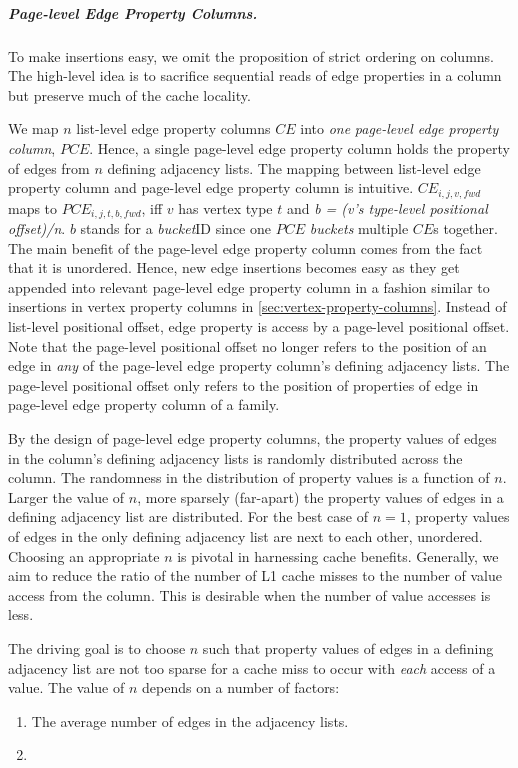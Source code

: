 \vspace{-16pt}
\subparagraph{Page-level Edge Property Columns.}
To make insertions easy, we omit the proposition of strict ordering on columns. The high-level idea is to sacrifice sequential reads of edge properties in a column but preserve much of the cache locality.

We map $n$ list-level edge property columns $CE$ into \emph{one} \emph{page-level edge property column}, $PCE$. Hence, a single page-level edge property column holds the property of edges from $n$ defining adjacency lists. The mapping between list-level edge property column and page-level edge property column is intuitive. $CE_{i,j,v,fwd}$ maps to $PCE_{i,j,t,b,fwd}$, iff $v$ has vertex type $t$ and \emph{b = (v's type-level positional offset)/n}. $b$ stands for a \emph{bucket}ID since  one $PCE$ \emph{buckets} multiple $CE$s together. The main benefit of the page-level edge property column comes from the fact that it is unordered. Hence, new edge insertions becomes easy as they get appended into relevant page-level edge property column in a fashion similar to insertions in vertex property columns in \ref{sec:vertex-property-columns}. Instead of list-level positional offset, edge property is access by a page-level positional offset. Note that the page-level positional offset no longer refers to the position of an edge in \emph{any} of the page-level edge property column's defining adjacency lists. The page-level positional offset only refers to the position of properties of edge in page-level edge property column of a family. 

By the design of page-level edge property columns, the property values of edges in the column's defining adjacency lists is randomly distributed across the column. The randomness in the distribution of property values is a function of $n$. Larger the value of $n$, more sparsely (far-apart) the property values of edges in a defining adjacency list are distributed. For the best case of $n=1$, property values of edges in the only defining adjacency list are next to each other, unordered. Choosing an appropriate $n$ is pivotal in harnessing cache benefits. Generally, we aim to reduce the ratio of the number of L1 cache misses to the number of value access from the column. This is desirable when the number of value accesses is less. 

The driving goal is to choose $n$ such that property values of edges in a defining adjacency list are not too sparse for a cache miss to occur with \emph{each} access of a value. The value of $n$ depends on a number of factors: 
\begin{enumerate}
	\item The average number of edges in the adjacency lists.
	\item  
\end{enumerate}

